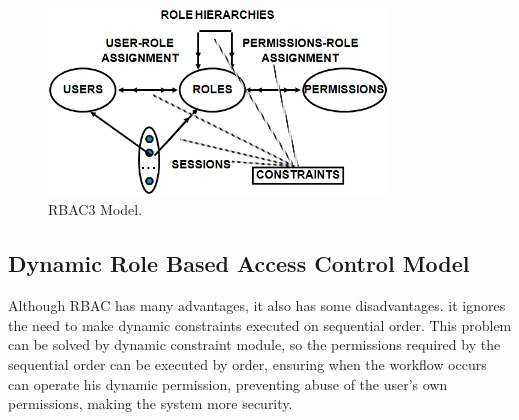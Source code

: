 \documentclass[12pt]{report}
\begin{document}
		\begin{figure}[H]
		\begin{center}
		\includegraphics[width=9cm]{./4-4.png}
		\caption{ RBAC3 Model. \label{fig:RBAC3 Model. }}
		\end{center}
		\end{figure}
		\newpage
		\subsection{Dynamic Role Based Access Control Model}
		\hspace{6mm}Although RBAC has many advantages, it also has some disadvantages. it ignores the need to make dynamic constraints executed on sequential order. This problem can be solved by dynamic constraint module, so the permissions required by the sequential order can be executed by order, ensuring when the workflow occurs can operate his dynamic permission, preventing abuse of the user’s own permissions, making the system more security.\newline
		
\end{document}
